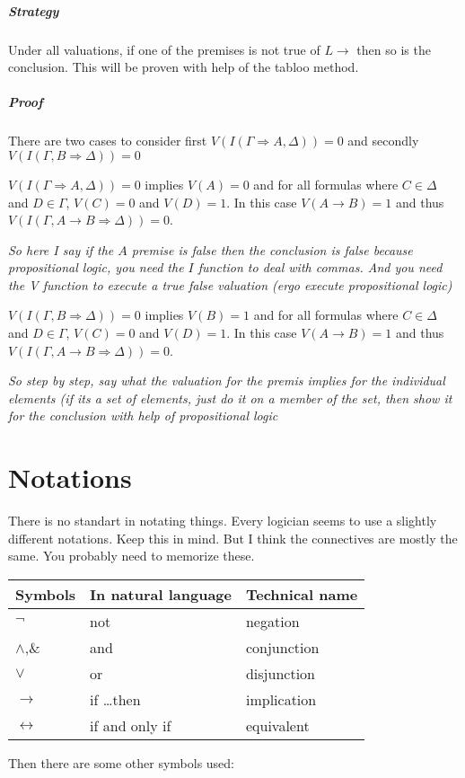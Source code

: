 \documentclass{article}
\begin{document}
\subparagraph{Strategy} Under all valuations, if one of the premises is not
true of $L\to$ then so is the conclusion. This will be proven with help
of the tabloo method.
\subparagraph{Proof}
There are two cases to consider first $V(I(\Gamma \Rightarrow  A, \Delta))=0$
and secondly $V(I(\Gamma, B \Rightarrow  \Delta))=0$

$V(I(\Gamma \Rightarrow  A, \Delta))=0$ implies $V(A)=0$ and for all formulas
where $C\in \Delta$ and $D \in \Gamma$, $V(C) = 0$ and $V(D)=1$. In this case
$V(A \to B) = 1$ and thus $V(I(\Gamma, A \to B \Rightarrow \Delta))=0$.

\emph{So here I say if the $A$ premise is false then the conclusion is false
	because propositional logic, you need the $I$ function to deal with
	commas. And you need the V function to execute a true false valuation
(ergo execute propositional logic)}

$V(I(\Gamma, B \Rightarrow \Delta))=0$ implies $V(B)=1$ and for all formulas
where $C\in \Delta$ and $D \in \Gamma$, $V(C) = 0$ and $V(D)=1$. In this case
$V(A \to B) = 1$ and thus $V(I(\Gamma, A \to B \Rightarrow \Delta))=0$.

\emph{So step by step, say what the valuation for the premis implies for the
	individual elements (if its a set of elements, just do it on a member of
the set, then show it for the conclusion with help of propositional logic}

\section{Notations}
\label{notations}
There is no standart in notating things. Every logician seems to use a
slightly different notations. Keep this in mind. But I think the connectives
are mostly the same. You probably need to memorize these.

\noindent
\begin{tabular}{@{}lll@{}}
Symbols&
In natural language &
Technical name \\ \toprule
$\neg$ 			& not 				& negation \\
$\wedge$,\& 	& and 				& conjunction \\
$\vee$ 			& or 				& disjunction\\
$\to$	& if \ldots then 	& implication\\
$\leftrightarrow$	& if and only if 	& equivalent\\ \bottomrule
\end{tabular}


Then there are some other symbols used:
\end{document}
